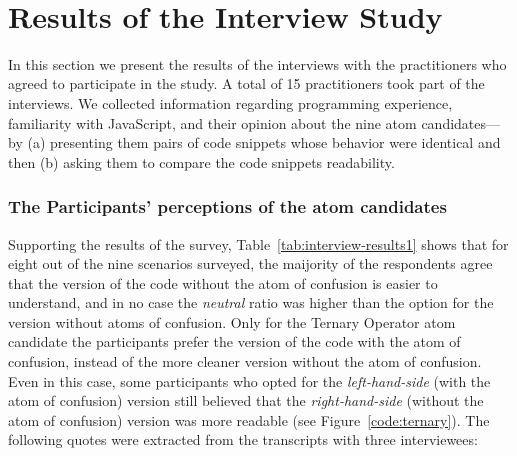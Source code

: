 \


\section{Results of the Interview Study}
\label{sec:interview-results}


In this section we present the results of the 
interviews with the practitioners who agreed to participate
in the study. A total of 15 practitioners
took part of the interviews.
We collected information regarding programming
experience, familiarity with JavaScript, and their opinion
about the nine atom candidates---by
(a) presenting them pairs of code snippets whose behavior were identical
and then (b) asking them to compare the code snippets readability.


\subsubsection*{The Participants' perceptions of the atom candidates}
Supporting the results of the survey, Table~\ref{tab:interview-results1}
 shows that for eight out of the
nine scenarios surveyed, the maijority of the respondents agree that the version of the
code without the atom of confusion is easier to understand, and in no case the \emph{neutral}
ratio was higher than the option for the version without atoms of confusion.
Only for the Ternary Operator atom candidate the participants
prefer the version of the code with the atom of confusion,
instead of the more cleaner version without the atom of confusion.
Even in this case, some participants who opted for
the \emph{left-hand-side} (with the atom of confusion) version
still believed that the \emph{right-hand-side} (without the atom of
confusion) version was more readable (see Figure~\ref{code:ternary}). 
The following quotes were extracted from the transcripts with
three interviewees:

